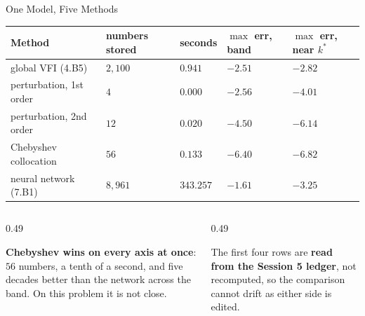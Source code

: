 \begin{frame}{One Model, Five Methods}
\vspace{-1mm}
\begin{center}\footnotesize
\begin{tabularx}{\linewidth}{@{}>{\raggedright\arraybackslash}X >{\raggedleft\arraybackslash}p{2.0cm} >{\raggedleft\arraybackslash}p{1.9cm} >{\raggedleft\arraybackslash}p{2.1cm} >{\raggedleft\arraybackslash}p{2.1cm}@{}}
\toprule
\textbf{Method} & \textbf{numbers stored} & \textbf{seconds} & \textbf{$\max$ err, band} & \textbf{$\max$ err, near $k^{*}$} \\
\midrule
global VFI (4.B5) & $2{,}100$ & $0.941$ & $-2.51$ & $-2.82$ \\
perturbation{,} 1st order & $4$ & $0.000$ & $-2.56$ & $-4.01$ \\
perturbation{,} 2nd order & $12$ & $0.020$ & $-4.50$ & $-6.14$ \\
Chebyshev collocation & $56$ & $0.133$ & $-6.40$ & $-6.82$ \\
neural network (7.B1) & $8{,}961$ & $343.257$ & $-1.61$ & $-3.25$ \\
\bottomrule
\end{tabularx}
\end{center}
\medskip
\begin{columns}[T]
\begin{column}{0.49\textwidth}
\begin{takeawaybox}\footnotesize
\textbf{Chebyshev wins on every axis at once}: $56$ numbers, a tenth of a second, and five decades better than the network across the band. On this problem it is not close.
\end{takeawaybox}
\end{column}
\begin{column}{0.49\textwidth}
\begin{cautionbox}\footnotesize
The first four rows are \textbf{read from the Session 5 ledger}, not recomputed, so the comparison cannot drift as either side is edited.
\end{cautionbox}
\end{column}
\end{columns}
\vspace{1mm}
\end{frame}

